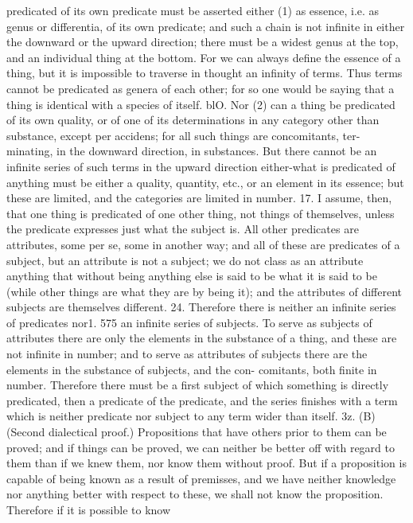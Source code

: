 {{{{{{{{{{{{{{{{{predicated of its own predicate must be asserted either (1) as
essence, i.e. as genus or differentia, of its own predicate; and
such a chain is not infinite in either the downward or the upward
direction; there must be a widest genus at the top, and an
individual thing at the bottom. For we can always define the
essence of a thing, but it is impossible to traverse in thought an
infinity of terms. Thus terms cannot be predicated as genera
of each other; for so one would be saying that a thing is identical
with a species of itself.
blO. Nor (2) can a thing be predicated of its own quality, or
of one of its determinations in any category other than substance,
except per accidens; for all such things are concomitants, ter-
minating, in the downward direction, in substances. But there
cannot be an infinite series of such terms in the upward direction
either-what is predicated of anything must be either a quality,
quantity, etc., or an element in its essence; but these are limited,
and the categories are limited in number.
17. I assume, then, that one thing is predicated of one other
thing, not things of themselves, unless the predicate expresses
just what the subject is. All other predicates are attributes, some
per se, some in another way; and all of these are predicates of a
subject, but an attribute is not a subject; we do not class as an
attribute anything that without being anything else is said to be
what it is said to be (while other things are what they are by being
it); and the attributes of different subjects are themselves different.
24. Therefore there is neither an infinite series of predicates nor1.
575
an infinite series of subjects. To serve as subjects of attributes
there are only the elements in the substance of a thing, and these
are not infinite in number; and to serve as attributes of subjects
there are the elements in the substance of subjects, and the con-
comitants, both finite in number. Therefore there must be a
first subject of which something is directly predicated, then a
predicate of the predicate, and the series finishes with a term
which is neither predicate nor subject to any term wider than
itself.
3z. (B) (Second dialectical proof.) Propositions that have
others prior to them can be proved; and if things can be proved,
we can neither be better off with regard to them than if we knew
them, nor know them without proof. But if a proposition is
capable of being known as a result of premisses, and we have
neither knowledge nor anything better with respect to these, we
shall not know the proposition. Therefore if it is possible to know
}}}}}}}}}}}}}}}}}
